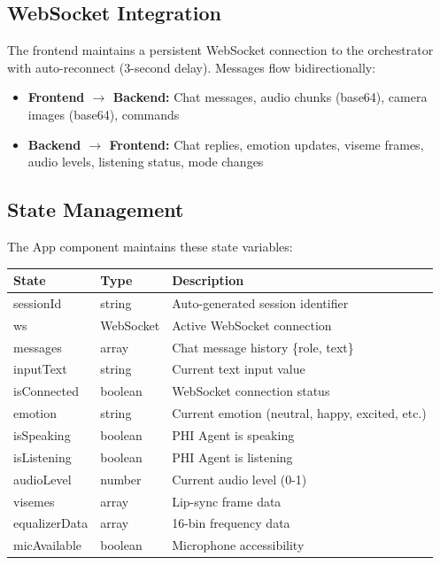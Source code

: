 \documentclass[12pt,a4paper,twoside]{report}
\begin{document}
\subsection{WebSocket Integration}

The frontend maintains a persistent WebSocket connection to the orchestrator with auto-reconnect (3-second delay). Messages flow bidirectionally:

\begin{itemize}
    \item \textbf{Frontend $\rightarrow$ Backend:} Chat messages, audio chunks (base64), camera images (base64), commands
    \item \textbf{Backend $\rightarrow$ Frontend:} Chat replies, emotion updates, viseme frames, audio levels, listening status, mode changes
\end{itemize}

\subsection{State Management}

The App component maintains these state variables:

\begin{longtable}{|l|l|p{6cm}|}
\hline
\rowcolor{phiblue!20}
\textbf{State} & \textbf{Type} & \textbf{Description} \\
\hline
sessionId & string & Auto-generated session identifier \\
\hline
ws & WebSocket & Active WebSocket connection \\
\hline
messages & array & Chat message history \{role, text\} \\
\hline
inputText & string & Current text input value \\
\hline
isConnected & boolean & WebSocket connection status \\
\hline
emotion & string & Current emotion (neutral, happy, excited, etc.) \\
\hline
isSpeaking & boolean & PHI Agent is speaking \\
\hline
isListening & boolean & PHI Agent is listening \\
\hline
audioLevel & number & Current audio level (0-1) \\
\hline
visemes & array & Lip-sync frame data \\
\hline
equalizerData & array & 16-bin frequency data \\
\hline
micAvailable & boolean & Microphone accessibility \\
\hline
\end{longtable}
\caption{React Application State}
\end{document}
